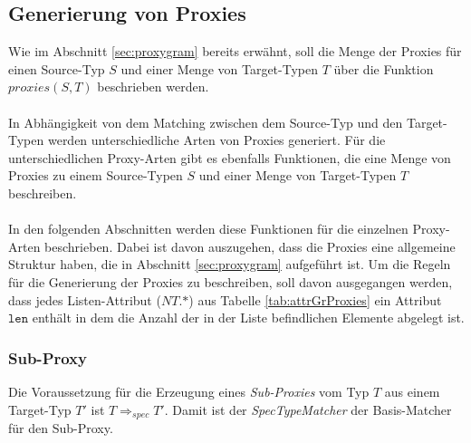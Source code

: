 \subsection{Generierung von Proxies}\label{sec_proxyGen}
Wie im Abschnitt \ref{sec:proxygram} bereits erwähnt, soll die Menge der Proxies für einen Source-Typ $S$ und einer Menge von Target-Typen $T$ über die Funktion $\mathit{proxies(S,T)}$ beschrieben werden.\\\\
In Abhängigkeit von dem Matching zwischen dem Source-Typ und den Target-Typen werden unterschiedliche Arten von Proxies generiert. Für die unterschiedlichen Proxy-Arten gibt es ebenfalls Funktionen, die eine Menge von Proxies zu einem Source-Typen $S$ und einer Menge von Target-Typen $T$ beschreiben.\\\\
In den folgenden Abschnitten werden diese Funktionen für die einzelnen Proxy-Arten beschrieben. Dabei ist davon auszugehen, dass die Proxies eine allgemeine Struktur haben, die in Abschnitt \ref{sec:proxygram} aufgeführt ist. Um die Regeln für die Generierung der Proxies zu beschreiben, soll davon ausgegangen werden, dass jedes Listen-Attribut ($\mathit{NT.}\text{*}$) aus Tabelle \ref{tab:attrGrProxies} ein Attribut $\texttt{len}$ enthält in dem die Anzahl der in der Liste befindlichen Elemente abgelegt ist.


\subsubsection{Sub-Proxy}
Die Voraussetzung für die Erzeugung eines \emph{Sub-Proxies} vom Typ $T$ aus einem Target-Typ $T'$ ist $T \Rightarrow_{spec} T'$. Damit ist der \emph{SpecTypeMatcher} der Basis-Matcher für den Sub-Proxy.
